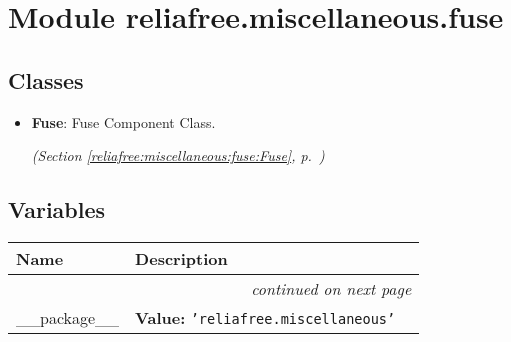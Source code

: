 %
%
%


\section{Module reliafree.miscellaneous.fuse}

    \label{reliafree:miscellaneous:fuse}


\subsection{Classes}

\begin{itemize}  \setlength{\parskip}{0ex}
  \item \textbf{Fuse}: Fuse Component Class.



  \textit{(Section \ref{reliafree:miscellaneous:fuse:Fuse}, p.~\pageref{reliafree:miscellaneous:fuse:Fuse})}

\end{itemize}


  \subsection{Variables}

    \vspace{-1cm}
\hspace{\varindent}\begin{longtable}{|p{\varnamewidth}|p{\vardescrwidth}|l}
\cline{1-2}
\cline{1-2} \centering \textbf{Name} & \centering \textbf{Description}& \\
\cline{1-2}
\endhead\cline{1-2}\multicolumn{3}{r}{\small\textit{continued on next page}}\\\endfoot\cline{1-2}
\endlastfoot\raggedright \_\-\_\-p\-a\-c\-k\-a\-g\-e\-\_\-\_\- & \raggedright \textbf{Value:} 
{\tt \texttt{'}\texttt{reliafree.miscellaneous}\texttt{'}}&\\
\cline{1-2}
\end{longtable}

